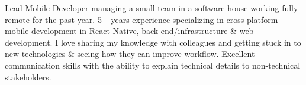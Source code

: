 


\begin{cvparagraph}
  Lead Mobile Developer managing a small team in a software house working fully remote for the past year. 5+ years experience specializing in cross-platform mobile development in React Native, back-end/infrastructure \& web development.
  I love sharing my knowledge with colleagues and getting stuck in to new technologies \& seeing how they can improve workflow. Excellent communication skills with the ability to explain technical details to non-technical stakeholders.
\end{cvparagraph}
